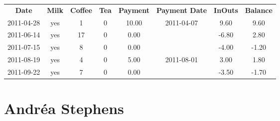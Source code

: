 \begin{center}
\begin{tabular}{cccccccc}
\textbf{Date} & \textbf{Milk} & \textbf{Coffee} & \textbf{Tea} & \textbf{Payment} & \textbf{Payment Date} & \textbf{InOuts} & \textbf{Balance} \\
2011-04-28 & yes &  1 & 0 & 10.00 & 2011-04-07 &  9.60 &  9.60\\ 
2011-06-14 & yes & 17 & 0 &  0.00 &  & -6.80 &  2.80\\ 
2011-07-15 & yes &  8 & 0 &  0.00 &  & -4.00 & -1.20\\ 
2011-08-19 & yes &  4 & 0 &  5.00 & 2011-08-01 &  3.00 &  1.80\\ 
2011-09-22 & yes &  7 & 0 &  0.00 &  & -3.50 & -1.70
\end{tabular}
\end{center}

\section{Andr\'ea Stephens}

